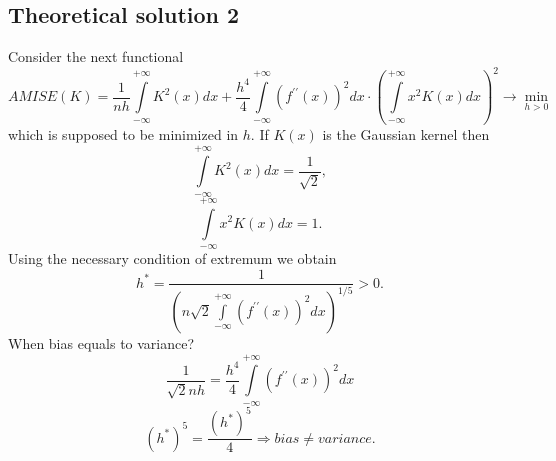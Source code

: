 \documentclass[a4paper, 12pt]{article}
\begin{document}
\subsection{Theoretical solution 2}
Consider the next functional
$$
AMISE(K) = \dfrac{1}{nh} \int \limits_{-\infty}^{+\infty} K^2(x) dx + \dfrac{h^4}{4} \int \limits_{-\infty}^{+\infty} (f^{\prime \prime}(x))^2 dx \cdot \left(\int \limits_{-\infty}^{+\infty} x^2 K(x) dx \right)^2 \rightarrow \min \limits_{h > 0}
$$  
which is supposed to be minimized in $h.$ If $K(x)$ is the Gaussian kernel then 
$$
\int \limits_{-\infty}^{+\infty} K^2(x) dx = \dfrac{1}{\sqrt{2}},
$$
$$
\int \limits_{-\infty}^{+\infty} x^2 K(x) dx = 1.
$$
Using the necessary condition of extremum we obtain
$$
h^* = \dfrac{1}{\left( n \sqrt{2} \int \limits_{-\infty}^{+\infty} (f^{\prime \prime}(x))^2 dx \right)^{1/5}} > 0.
$$
When bias equals to variance?
$$
\dfrac{1}{\sqrt{2}nh} = \dfrac{h^4}{4} \int \limits_{-\infty}^{+\infty} (f^{\prime \prime}(x))^2 dx
$$
$$
(h^*)^5 = \dfrac{(h^*)^5}{4} \Rightarrow bias \neq variance.
$$
\end{document}
